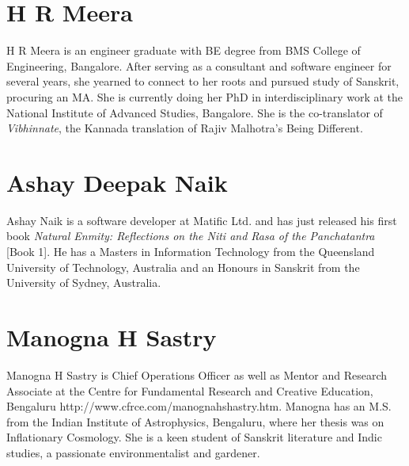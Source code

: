 \section*{H R Meera}

H R Meera is an engineer graduate with BE degree from BMS College of Engineering, Bangalore. After serving as a consultant and software engineer for several years, she yearned to connect to her roots and pursued study of Sanskrit, procuring an MA. She is currently doing her PhD in interdisciplinary work at the National Institute of Advanced Studies, Bangalore. She is the co-translator of {\sl Vibhinnate}, the Kannada translation of Rajiv Malhotra’s Being Different.

\section*{Ashay Deepak Naik}

Ashay Naik is a software developer at Matific Ltd. and has just released his first book {\sl Natural Enmity: Reflections on the Niti and Rasa of the Panchatantra} [Book 1]. He has a Masters in Information Technology from the Queensland University of Technology, Australia and an Honours in Sanskrit from the University of Sydney, Australia.

\section*{Manogna H Sastry}

Manogna H Sastry is Chief Operations Officer as well as Mentor and Research Associate at the Centre for Fundamental Research and Creative Education, Bengaluru http://www.cfrce.com/manognahshastry.htm. Manogna has an M.S. from the Indian Institute of Astrophysics, Bengaluru, where her thesis was on Inflationary Cosmology. She is a keen student of Sanskrit literature and Indic studies, a passionate environmentalist and gardener.

